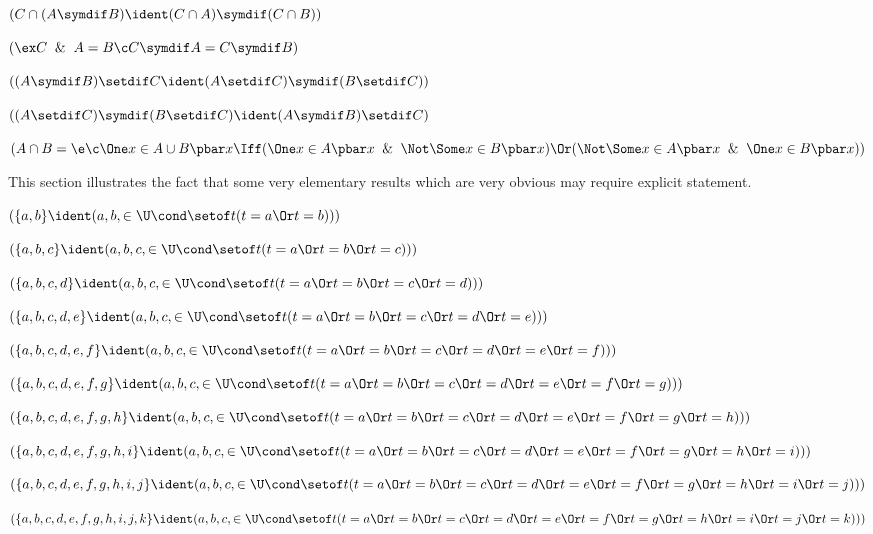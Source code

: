  $(C \cap (A \symdif B) \ident (C \cap A )\symdif (C \cap B))$

 $(\ex C \And A = B \c C \symdif A = C \symdif B)$

 $((A \symdif B) \setdif C \ident (A \setdif C)\symdif (B\setdif C))$

 $( (A \setdif C)\symdif (B\setdif C) \ident (A \symdif B) \setdif C )$



 $(A \cap B = \e \c \One x \in A \cup B\pbar x
\Iff (\One x \in A \pbar x \And \Not\Some x \in B \pbar x) \Or
( \Not\Some x \in A \pbar x\And \One x \in B \pbar x  ))$
\lineb


This section illustrates the fact that some very elementary results
which are very obvious may require explicit statement.
\lineb


 $(\{a,b\} \ident (a,b, \in \U \cond \setof t(t = a \Or t = b)))$

 $(\{a,b,c\} \ident (a,b,c, \in \U \cond \setof t(t = a \Or t = b \Or t = c)))$

 $(\{a,b,c,d\} \ident (a,b,c, \in \U \cond \setof t(t = a \Or t = b \Or t = c \Or t = d )))$

 $(\{a,b,c,d,e\} \ident (a,b,c, \in \U \cond \setof t(t = a \Or t = b \Or t = c \Or t = d \Or t =e)))$

 $(\{a,b,c,d,e,f\} \ident (a,b,c, \in \U \cond \setof t(t = a \Or t = b \Or t = c \Or t = d \Or t =e \Or t =f)))$

 $(\{a,b,c,d,e,f,g\} \ident (a,b,c, \in \U \cond \setof t(t = a \Or t = b \Or t = c \Or t=d \Or t=e \Or t =f \Or t=g)))$

 $(\{a,b,c,d,e,f,g,h\} \ident (a,b,c, \in \U \cond \setof t(t = a \Or t = b \Or t = c \Or t=d \Or t=e \Or t =f \Or t=g \Or t=h)))$

 $(\{a,b,c,d,e,f,g,h,i\} \ident (a,b,c, \in \U \cond \setof t(t = a \Or t = b \Or t = c \Or t=d \Or t=e \Or t =f \Or t=g \Or t=h \Or t=i)))$

 $(\{a,b,c,d,e,f,g,h,i,j\} \ident (a,b,c, \in \U \cond \setof t(t = a \Or t = b \Or t = c \Or t=d \Or t=e \Or t =f \Or t=g \Or t=h \Or t=i \Or t=j)))$

 $(\{a,b,c,d,e,f,g,h,i,j,k\} \ident (a,b,c, \in \U \cond \setof t(t = a \Or t = b \Or t = c \Or t=d \Or t=e \Or t =f \Or t=g \Or t=h \Or t=i \Or t=j \Or t=k)))$

